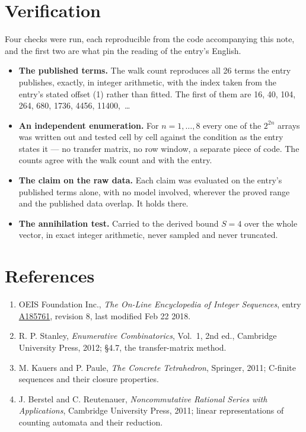 \documentclass[11pt]{article}
\theoremstyle{definition}
\begin{document}
\section{Verification}

Four checks were run, each reproducible from the code accompanying this note, and the first two are what pin the reading of the entry's English.

\begin{itemize}

\item {\bfseries The published terms.} The walk count reproduces all 26 terms the entry publishes, exactly, in integer arithmetic, with the index taken from the entry's stated offset (1) rather than fitted. The first of them are 16, 40, 104, 264, 680, 1736, 4456, 11400,~\dots

\item {\bfseries An independent enumeration.} For $n = 1,\dots,8$ every one of the $2^{2n}$ arrays was written out and tested cell by cell against the condition as the entry states it --- no transfer matrix, no row window, a separate piece of code. The counts agree with the walk count and with the entry.

\item {\bfseries The claim on the raw data.} Each claim was evaluated on the entry's published terms alone, with no model involved, wherever the proved range and the published data overlap. It holds there.

\item {\bfseries The annihilation test.} Carried to the derived bound $S = 4$ over the whole vector, in exact integer arithmetic, never sampled and never truncated.

\end{itemize}

\section{References}

\begin{enumerate}

\item OEIS Foundation Inc., \emph{The On-Line Encyclopedia of Integer Sequences}, entry \href{https://oeis.org/A185761}{A185761}, revision 8, last modified Feb 22 2018.

\item R. P. Stanley, \emph{Enumerative Combinatorics}, Vol.~1, 2nd ed., Cambridge University Press, 2012; \S4.7, the transfer-matrix method.

\item M. Kauers and P. Paule, \emph{The Concrete Tetrahedron}, Springer, 2011; C-finite sequences and their closure properties.

\item J. Berstel and C. Reutenauer, \emph{Noncommutative Rational Series with Applications}, Cambridge University Press, 2011; linear representations of counting automata and their reduction.

\end{enumerate}
\end{document}
